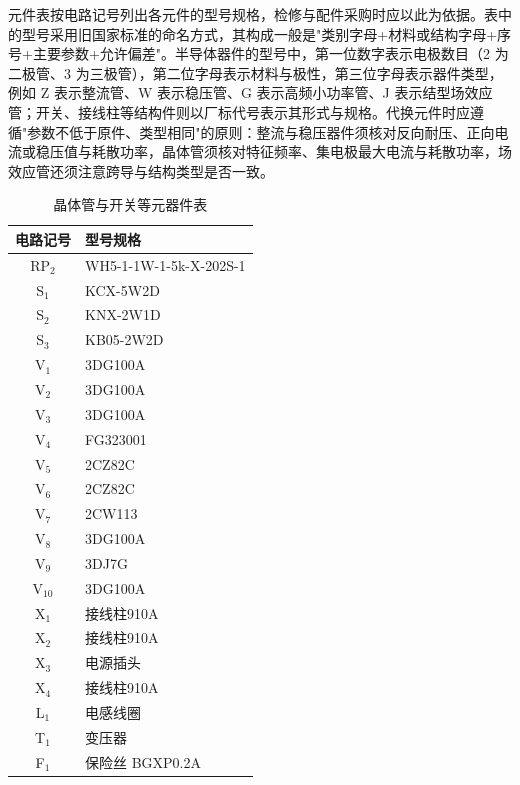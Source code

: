 \documentclass[12pt,UTF8]{ctexbook}
\begin{document}
	元件表按电路记号列出各元件的型号规格，检修与配件采购时应以此为依据。表中的型号采用旧国家标准的命名方式，其构成一般是"类别字母+材料或结构字母+序号+主要参数+允许偏差"。半导体器件的型号中，第一位数字表示电极数目（2 为二极管、3 为三极管），第二位字母表示材料与极性，第三位字母表示器件类型，例如 Z 表示整流管、W 表示稳压管、G 表示高频小功率管、J 表示结型场效应管；开关、接线柱等结构件则以厂标代号表示其形式与规格。代换元件时应遵循"参数不低于原件、类型相同"的原则：整流与稳压器件须核对反向耐压、正向电流或稳压值与耗散功率，晶体管须核对特征频率、集电极最大电流与耗散功率，场效应管还须注意跨导与结构类型是否一致。
	
	\begin{table}[H]
		\centering
		\caption{晶体管与开关等元器件表}
		\begin{tabularx}{\textwidth}{|c|X|}
			\hline
			\textbf{电路记号} & \textbf{型号规格} \\ \hline
			RP\(_2\) & WH5-1-1W-1-5k-X-202S-1 \\ \hline
			S\(_1\) & KCX-5W2D \\ \hline
			S\(_2\) & KNX-2W1D \\ \hline
			S\(_3\) & KB05-2W2D \\ \hline
			V\(_1\) & 3DG100A \\ \hline
			V\(_2\) & 3DG100A \\ \hline
			V\(_3\) & 3DG100A \\ \hline
			V\(_4\) & FG323001 \\ \hline
			V\(_5\) & 2CZ82C \\ \hline
			V\(_6\) & 2CZ82C \\ \hline
			V\(_7\) & 2CW113 \\ \hline
			V\(_8\) & 3DG100A \\ \hline
			V\(_9\) & 3DJ7G \\ \hline
			V\(_{10}\) & 3DG100A \\ \hline
			X\(_1\) & 接线柱910A \\ \hline
			X\(_2\) & 接线柱910A \\ \hline
			X\(_3\) & 电源插头 \\ \hline
			X\(_4\) & 接线柱910A \\ \hline
			L\(_1\) & 电感线圈 \\ \hline
			T\(_1\) & 变压器 \\ \hline
			F\(_1\) & 保险丝 BGXP0.2A \\ \hline
		\end{tabularx}
	\end{table}
	
\end{document}
